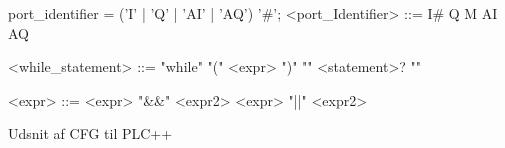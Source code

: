 \begin{Grammar}
 \begin{grammar}
 port_identifier = ('I' | 'Q' | 'AI' | 'AQ') '#';
 <port\_Identifier> ::= I#
 \alt Q
 \alt M
 \alt AI
 \alt AQ
 
 <while\_statement> ::= "while" "(" <expr> ")" "{" <statement>? "}"
 
 <expr> ::= <expr> "&&" <expr2>
 \alt <expr> "||" <expr2>
  
  
 \end{grammar}
 \caption{Udsnit af CFG til PLC++}\label{gra:udsnit}
\end{Grammar}